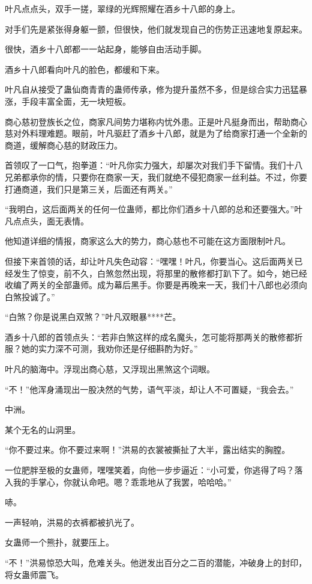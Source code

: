 \begin{this_body}
叶凡点点头，双手一搓，翠绿的光辉照耀在酒乡十八郎的身上。

对手们先是紧张得身躯一颤，但很快，他们就发现自己的伤势正迅速地复原起来。

很快，酒乡十八郎都一一站起身，能够自由活动手脚。

酒乡十八郎看向叶凡的脸色，都缓和下来。

叶凡自从接受了蛊仙商青青的蛊师传承，修为提升虽然不多，但是综合实力迅猛暴涨，手段丰富全面，无一块短板。

商心慈初登族长之位，商家凡间势力堪称内忧外患。正是叶凡挺身而出，帮助商心慈对外料理难题。眼前，叶凡驱赶了酒乡十八郎，就是为了给商家打通一个全新的商道，缓解商心慈的财政压力。

首领叹了一口气，抱拳道：“叶凡你实力强大，却屡次对我们手下留情。我们十八兄弟都承你的情，只要你在商家一天，我们就绝不侵犯商家一丝利益。不过，你要打通商道，我们只是第三关，后面还有两关。”

“我明白，这后面两关的任何一位蛊师，都比你们酒乡十八郎的总和还要强大。”叶凡点点头，面无表情。

他知道详细的情报，商家这么大的势力，商心慈也不可能在这方面限制叶凡。

但接下来首领的话，却让叶凡失色动容：“嘿嘿！叶凡，你要当心。这后面两关已经发生了惊变，前不久，白煞忽然出现，将那里的散修都打趴下了。如今，她已经收编了两关的全部蛊师。成为幕后黑手。你要是再晚来一天，我们十八郎也必须向白煞投诚了。”

“白煞？你是说黑白双煞？”叶凡双眼暴****芒。

酒乡十八郎的首领点头：“若非白煞这样的成名魔头，怎可能将那两关的散修都折服？她的实力深不可测，我劝你还是仔细斟酌为好。”

叶凡的脑海中。浮现出商心慈，又浮现出黑煞这个词眼。

“不！”他浑身涌现出一股决然的气势，语气平淡，却让人不可置疑，“我会去。”

中洲。

某个无名的山洞里。

“你不要过来。你不要过来啊！”洪易的衣裳被撕扯了大半，露出结实的胸膛。

一位肥胖至极的女蛊师，嘿嘿笑着，向他一步步逼近：“小可爱，你逃得了吗？落入我的手掌心，你就认命吧。嗯？乖乖地从了我罢，哈哈哈。”

哧。

一声轻响，洪易的衣裤都被扒光了。

女蛊师一个熊扑，就要压上。

“不！”洪易惊恐大叫，危难关头。他迸发出百分之二百的潜能，冲破身上的封印，将女蛊师震飞。


\end{this_body}
